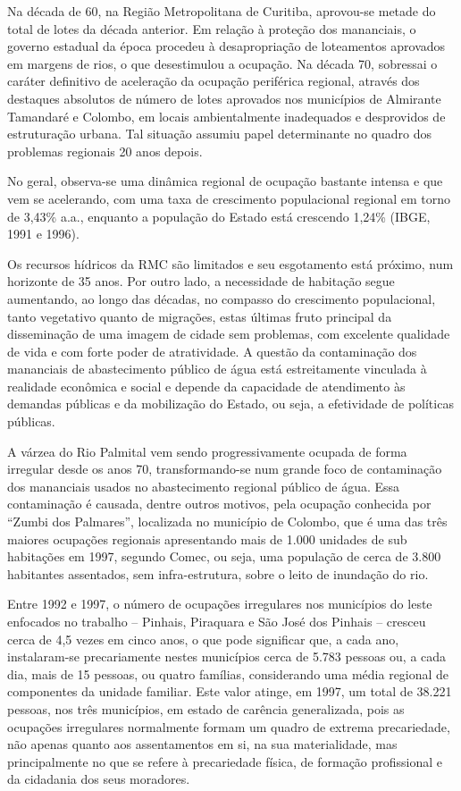 	Na década de 60, na Região Metropolitana de Curitiba, aprovou-se metade do total de lotes da década anterior. Em relação à proteção dos mananciais, o governo estadual da época procedeu à desapropriação de loteamentos aprovados em margens de rios, o que desestimulou a ocupação. Na década 70, sobressai o caráter definitivo de aceleração da ocupação periférica regional, através dos destaques absolutos de número de lotes aprovados nos municípios de Almirante Tamandaré e Colombo, em locais ambientalmente inadequados e desprovidos de estruturação urbana. Tal situação assumiu papel determinante no quadro dos problemas regionais 20 anos depois.
	
	No geral, observa-se uma dinâmica regional de ocupação bastante intensa e que vem se acelerando, com uma taxa de crescimento populacional regional em torno de 3,43\% a.a., enquanto a população do Estado está crescendo 1,24\% (IBGE, 1991 e 1996).
	
	Os recursos hídricos da RMC são limitados e seu esgotamento está próximo, num horizonte de 35 anos. Por outro lado, a necessidade de habitação segue aumentando, ao longo das décadas, no compasso do crescimento populacional, tanto vegetativo quanto de migrações, estas últimas fruto principal da disseminação de uma imagem de cidade sem problemas, com excelente qualidade de vida e com forte poder de atratividade. A questão da contaminação dos mananciais de abastecimento público de água está estreitamente vinculada à realidade econômica e social e depende da capacidade de atendimento às demandas públicas e da mobilização do Estado, ou seja, a efetividade de políticas públicas.
	
	A várzea do Rio Palmital vem sendo progressivamente ocupada de forma irregular desde os anos 70, transformando-se num grande foco de contaminação dos mananciais usados no abastecimento regional público de água. Essa contaminação é causada, dentre outros motivos, pela ocupação conhecida por “Zumbi dos Palmares”, localizada no município de Colombo, que é uma das três maiores ocupações regionais apresentando mais de 1.000 unidades de sub habitações em 1997, segundo Comec, ou seja, uma população de cerca de 3.800 habitantes assentados, sem infra-estrutura, sobre o leito de inundação do rio. 
	
	Entre 1992 e 1997, o número de ocupações irregulares nos municípios do leste enfocados no trabalho – Pinhais, Piraquara e São José dos Pinhais – cresceu cerca de 4,5 vezes em cinco anos, o que pode significar que, a cada ano, instalaram-se precariamente nestes municípios cerca de 5.783 pessoas ou, a cada dia, mais de 15 pessoas, ou quatro famílias, considerando uma média regional de componentes da unidade familiar. Este valor atinge, em 1997, um total de 38.221 pessoas, nos três municípios, em estado de carência generalizada, pois as ocupações irregulares normalmente formam um quadro de extrema precariedade, não apenas quanto aos assentamentos em si, na sua materialidade, mas principalmente no que se refere à precariedade física, de formação profissional e da cidadania dos seus moradores.

